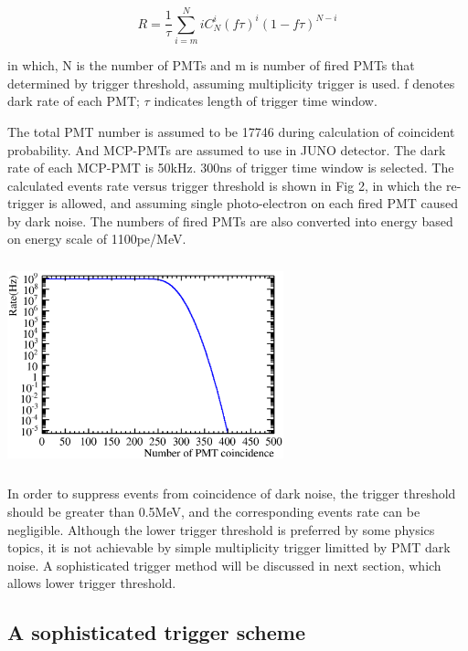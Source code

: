 \documentclass[a4paper,10pt,twoside]{paper}
\begin{document}
\begin{multicols}{2}
		\begin{displaymath}
			R = \frac{1}{\tau}\sum_{i=m}^{N}iC^{i}_{N}(f\tau)^i
			(1-f\tau)^{N-i}
		\end{displaymath}

		in which, N is the number of PMTs and m is number of fired PMTs that determined by trigger threshold, assuming multiplicity trigger is used.
		f denotes dark rate of each PMT; $\tau$ indicates length of trigger time window.

		The total PMT number is assumed to be 17746 during calculation of coincident probability. 
		And MCP-PMTs are assumed to use in JUNO detector. The dark rate of each MCP-PMT is 50kHz. 300ns of trigger time window is selected.
		The calculated events rate versus trigger threshold is shown in Fig 2, in which the re-trigger is allowed,
		and assuming single photo-electron on each fired PMT caused by dark noise.
		The numbers of fired PMTs are also converted into energy based on energy scale of 1100pe/MeV.

		\begin{center}
			\includegraphics[width=8cm,height=6cm]{Noise_rate_50kHz_300ns.eps}
		\end{center}


		In order to suppress events from coincidence of dark noise, the trigger threshold should be greater than 0.5MeV, 
		and the corresponding events rate can be negligible. Although the lower trigger threshold is preferred by some physics topics,
		it is not achievable by simple multiplicity trigger limitted by PMT dark noise. A sophisticated trigger method will
		be discussed in next section, which allows lower trigger threshold. 


		\subsection{A sophisticated trigger scheme}


\end{multicols}
\end{document}
